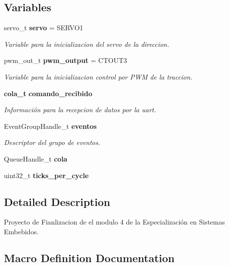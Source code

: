 \subsection*{Variables}
\begin{DoxyCompactItemize}
\item 
servo\+\_\+t \textbf{ servo} = S\+E\+R\+V\+O1
\begin{DoxyCompactList}\small\item\em Variable para la inicializacion del servo de la direccion. \end{DoxyCompactList}\item 
pwm\+\_\+out\+\_\+t \textbf{ pwm\+\_\+output} = C\+T\+O\+U\+T3
\begin{DoxyCompactList}\small\item\em Variable para la inicializacion control por P\+WM de la traccion. \end{DoxyCompactList}\item 
\textbf{ cola\+\_\+t} \textbf{ comando\+\_\+recibido}
\begin{DoxyCompactList}\small\item\em Información para la recepcion de datos por la uart. \end{DoxyCompactList}\item 
Event\+Group\+Handle\+\_\+t \textbf{ eventos}
\begin{DoxyCompactList}\small\item\em Descriptor del grupo de eventos. \end{DoxyCompactList}\item 
Queue\+Handle\+\_\+t \textbf{ cola}
\item 
uint32\+\_\+t \textbf{ ticks\+\_\+per\+\_\+cycle}
\end{DoxyCompactItemize}


\subsection{Detailed Description}
Proyecto de Fianlizacion de el modulo 4 de la Especialización en Sistemas Embebidos. 



\subsection{Macro Definition Documentation}
\mbox{\label{group__ejemplos_ga955f504eccf76b4eb2489c0adab03121}} 
